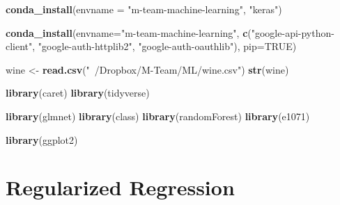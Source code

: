 \documentclass[]{book}
\newenvironment{Shaded}{\begin{snugshade}}{\end{snugshade}}
\newcommand{\KeywordTok}[1]{\textcolor[rgb]{0.13,0.29,0.53}{\textbf{#1}}}
\newcommand{\DataTypeTok}[1]{\textcolor[rgb]{0.13,0.29,0.53}{#1}}
\newcommand{\StringTok}[1]{\textcolor[rgb]{0.31,0.60,0.02}{#1}}
\newcommand{\OtherTok}[1]{\textcolor[rgb]{0.56,0.35,0.01}{#1}}
\newcommand{\NormalTok}[1]{#1}
\begin{document}
\begin{Shaded}
\begin{Highlighting}[]
\KeywordTok{conda_install}\NormalTok{(}\DataTypeTok{envname =} \StringTok{"m-team-machine-learning"}\NormalTok{,}
              \StringTok{"keras"}\NormalTok{)}
\end{Highlighting}
\end{Shaded}

\begin{Shaded}
\begin{Highlighting}[]
\KeywordTok{conda_install}\NormalTok{(}\DataTypeTok{envname=}\StringTok{"m-team-machine-learning"}\NormalTok{,}
              \KeywordTok{c}\NormalTok{(}\StringTok{"google-api-python-client"}\NormalTok{,}
                \StringTok{"google-auth-httplib2"}\NormalTok{,}
                \StringTok{"google-auth-oauthlib"}\NormalTok{),}
              \DataTypeTok{pip=}\OtherTok{TRUE}\NormalTok{)}
\end{Highlighting}
\end{Shaded}

\begin{Shaded}
\begin{Highlighting}[]
\NormalTok{wine <-}\StringTok{ }\KeywordTok{read.csv}\NormalTok{(}\StringTok{"~/Dropbox/M-Team/ML/wine.csv"}\NormalTok{)}
\KeywordTok{str}\NormalTok{(wine)}
\end{Highlighting}
\end{Shaded}

\begin{Shaded}
\begin{Highlighting}[]
\KeywordTok{library}\NormalTok{(caret)}
\KeywordTok{library}\NormalTok{(tidyverse)}

\KeywordTok{library}\NormalTok{(glmnet)}
\KeywordTok{library}\NormalTok{(class)}
\KeywordTok{library}\NormalTok{(randomForest)}
\KeywordTok{library}\NormalTok{(e1071)}

\KeywordTok{library}\NormalTok{(ggplot2)}
\end{Highlighting}
\end{Shaded}

\hypertarget{regularized-regression-1}{%
\chapter{Regularized Regression}\label{regularized-regression-1}}
\end{document}

